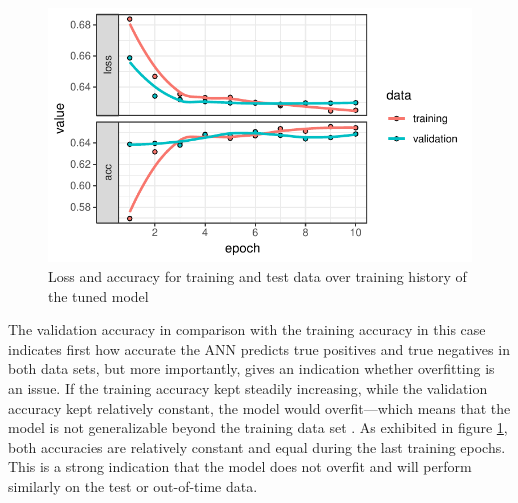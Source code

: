 \documentclass[12pt,a4paper]{article}
\begin{document}
\begin{figure}[ht]
	\centering
  \includegraphics[scale=0.8]{figures/train_history.pdf}
	\caption{Loss and accuracy for training and test data over training history of the tuned model}
	\label{fig_history}
\end{figure}
The validation accuracy in comparison with the training accuracy in this case indicates first how accurate the ANN predicts true positives 
and true negatives in both data sets, but more importantly, gives an indication whether overfitting is an issue.
If the training accuracy kept steadily increasing, while the validation accuracy kept relatively constant, the model would overfit---which means
that the model is not generalizable beyond the training data set \citep{hansenNeuralNetworkEnsembles1990}.
As exhibited in figure \ref{fig_history}, both accuracies are relatively constant and equal during the last training epochs.
This is a strong indication that the model does not overfit and will perform similarly on the test or out-of-time data.
\end{document}
